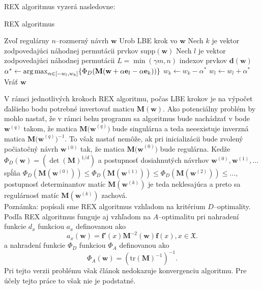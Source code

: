 REX algoritmus vyzerá nasledovne:

\begin{algorithm}[H]
	\caption{REX algoritmus \cite{rex_harman}}
	\label{rex}
	\begin{algorithmic}[1]
		\State Zvoľ regulárny $n$--rozmerný návrh $\mathbf w$
			\State Urob LBE krok vo $\mathbf w$
			\State Nech $k$ je vektor zodpovedajúci náhodnej permutácii prvkov supp$(\mathbf w)$
			\State Nech $l$ je vektor zodpovedajúci náhodnej permutácii $L=\min(\gamma m, n)$ indexov prvkov $\mathbf {d(w)}$
					\State $\alpha^* \leftarrow \operatorname*{arg\,max}_{\alpha \in [-w_l, w_k]} \{ \Phi_D(\mathbf M(\mathbf w+\alpha \mathbf e_l -\alpha \mathbf e_k))\}$
						\State $w_k \leftarrow w_k - \alpha^*$
						\State $w_l \leftarrow w_l + \alpha^*$
					\EndIf
				\EndFor
			\EndFor
		\EndWhile
		\State Vráť $\mathbf w$
	\end{algorithmic}
\end{algorithm}

V rámci jednotlivých krokoch REX algoritmu, počas LBE krokov je na výpočet ďalšieho bodu potrebné invertovať maticu $\mathbf{M(w)}$. Ako potenciálny problém by mohlo nastať, že v rámci behu programu sa algoritmus bude nachádzať v bode $\mathbf w^{(q)}$ takom, že matica  $\mathbf{M(w}^{(q)})$ bude singulárna a teda neeexistuje inverzná matica $\mathbf{M(w}^{(q)})^{-1}$. To však nastať nemôže, ak pri inicializácii bude zvolený počiatočný návrh $\mathbf w^{(0)}$ tak, že matica $\mathbf{M(w}^{(0)})$ bude regulárna. Kedže $\Phi_D(\mathbf{w})=(\det(\mathbf{M})^{1/d})$ a postupnosť dosiahnutých návrhov $\mathbf w^{(0)}, \mathbf w^{(1)}, \dots$ spĺňa $ \Phi_D(\mathbf M(\mathbf w^{(0)})) \leq \Phi_D(\mathbf M(\mathbf w^{(1)})) \leq \Phi_D(\mathbf M(\mathbf w^{(2)})) \leq \dots$, postupnosť determinantov matíc $\mathbf M(\mathbf w^{(k)})$ je teda neklesajúca a preto sa regulárnosť matíc $\mathbf M(\mathbf w^{(k)})$ zachová.\\

Poznámka: popísali sme REX algoritmus vzhľadom na kritérium $D$--optimality. Podľa \cite{rex_harman} REX algoritmus funguje aj vzhľadom na $A$--optimalitu pri nahradení funkcie $d_x$ funkciou $a_x$ definovanou ako $$a_x(\mathbf w)=\mathbf {f'}(x)\mathbf M^{-2}(\mathbf w)\mathbf f(x), x \in \mathfrak X.$$ a nahradení funkcie $\Phi_D$ funkciou $\Phi_A$ definovanou ako $$\Phi_A(\mathbf{w})=(\text{tr}(\mathbf M)^{-1})^{-1}.$$ Pri tejto verzii problému však článok \cite{rex_harman} nedokazuje konvergenciu algoritmu. Pre účely tejto práce to však nie je podstatné.